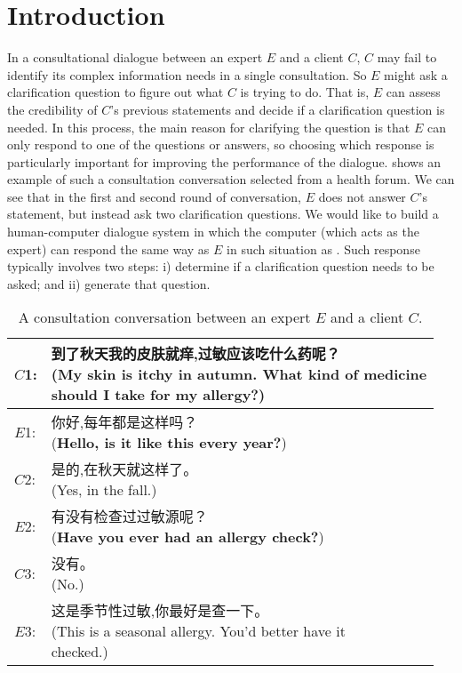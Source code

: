 \section{Introduction}
\label{intro}

In a consultational dialogue between an expert $E$ and a client $C$, $C$ may 
fail to identify its complex information needs in a single consultation. 
So $E$ might ask a clarification question to figure out what $C$ is trying to do. That is, $E$ can assess the credibility of $C$'s previous statements and decide if a clarification question is needed. 
In this process, the main reason for clarifying the question is that $E$ 
can only respond to one of the questions or answers, 
so choosing which response is particularly important for improving 
the performance of the dialogue.  shows an 
example of such a consultation conversation selected from a health forum. 
We can see that in the first and second round of conversation, 
$E$ does not answer $C$'s statement, but instead ask 
two clarification questions. 
We would like to build a human-computer dialogue system in which
the computer (which acts as the expert) can respond the same way as $E$
in such situation as . 
Such response typically involves two steps:
i) determine if a clarification question needs to be asked; and ii)
generate that question.

\begin{CJK}{UTF8}{gbsn}
\begin{table}[th]
\small
\begin{tabular}[t]{p{0.5cm}p{6.5cm}}
\toprule
$C$1:&\makecell[l]{到了秋天我的皮肤就痒,过敏应该吃什么药呢？\\(My skin is itchy in autumn. What kind of medicine\\ should I take for my allergy?)}\\
\hline
$E$1:&\makecell[l]{你好,每年都是这样吗？\\(\textbf{Hello, is it like this every year?})}\\
\hline
$C$2:&\makecell[l]{是的,在秋天就这样了。\\(Yes, in the fall.)}\\
\hline
$E$2:&\makecell[l]{有没有检查过过敏源呢？\\(\textbf{Have you ever had an allergy check?})}\\
\hline
$C$3:&\makecell[l]{没有。\\(No.)}\\
\hline
$E$3:&\makecell[l]{这是季节性过敏,你最好是查一下。\\(This is a seasonal allergy. You'd better have it\\ checked.)}\\
\bottomrule
\end{tabular}
\caption{A consultation conversation between an expert $E$ and a client $C$.}
\label{tab:example1}
\end{table}
\end{CJK}


